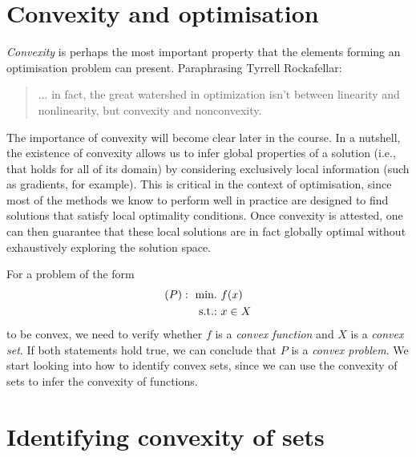 

\section{Convexity and optimisation}

\emph{Convexity} is perhaps the most important property that the elements forming an optimisation problem can present. Paraphrasing Tyrrell Rockafellar:

\begin{quote}
... in fact, the great watershed in optimization isn't between linearity and nonlinearity, but convexity and nonconvexity.
\end{quote}

The importance of convexity will become clear later in the course. In a nutshell, the existence of convexity allows us to infer global properties of a solution (i.e., that holds for all of its domain) by considering exclusively local information (such as gradients, for example). This is critical in the context of optimisation, since most of the methods we know to perform well in practice are designed to find solutions that satisfy local optimality conditions. Once convexity is attested, one can then guarantee that these local solutions are in fact globally optimal without exhaustively exploring the solution space. 

For a problem of the form
% 
\begin{align*}
    (P) :~ \mathop{\text{min.~}} & f(x) \\
    \mathop{\text{s.t.:~}} & x \in X
\end{align*}
%
to be convex, we need to verify whether $f$ is a \emph{convex function} and $X$ is a \emph{convex set}. If both statements hold true, we can conclude that $P$ is a \emph{convex problem}. We start looking into how to identify convex sets, since we can use the convexity of sets to infer the convexity of functions.


\section{Identifying convexity of sets}
 
